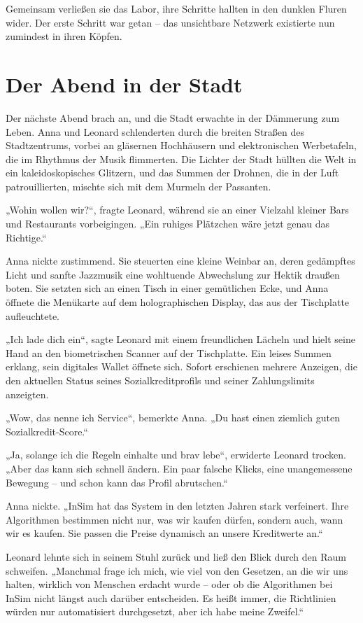 \documentclass[
]{article}
\begin{document}
Gemeinsam verließen sie das Labor, ihre Schritte hallten in den dunklen Fluren wider. Der erste Schritt war getan -- das unsichtbare Netzwerk existierte nun zumindest in ihren Köpfen.

\section{Der Abend in der Stadt}\label{der-abend-in-der-stadt}

Der nächste Abend brach an, und die Stadt erwachte in der Dämmerung zum Leben. Anna und Leonard schlenderten durch die breiten Straßen des Stadtzentrums, vorbei an gläsernen Hochhäusern und elektronischen Werbetafeln, die im Rhythmus der Musik flimmerten. Die Lichter der Stadt hüllten die Welt in ein kaleidoskopisches Glitzern, und das Summen der Drohnen, die in der Luft patrouillierten, mischte sich mit dem Murmeln der Passanten.

„Wohin wollen wir?{\kern0pt}``, fragte Leonard, während sie an einer Vielzahl kleiner Bars und Restaurants vorbeigingen. „Ein ruhiges Plätzchen wäre jetzt genau das Richtige.``

Anna nickte zustimmend. Sie steuerten eine kleine Weinbar an, deren gedämpftes Licht und sanfte Jazzmusik eine wohltuende Abwechslung zur Hektik draußen boten. Sie setzten sich an einen Tisch in einer gemütlichen Ecke, und Anna öffnete die Menükarte auf dem holographischen Display, das aus der Tischplatte aufleuchtete.

„Ich lade dich ein``, sagte Leonard mit einem freundlichen Lächeln und hielt seine Hand an den biometrischen Scanner auf der Tischplatte. Ein leises Summen erklang, sein digitales Wallet öffnete sich. Sofort erschienen mehrere Anzeigen, die den aktuellen Status seines Sozialkreditprofils und seiner Zahlungslimits anzeigten.

„Wow, das nenne ich Service``, bemerkte Anna. „Du hast einen ziemlich guten Sozialkredit-Score.``

„Ja, solange ich die Regeln einhalte und brav lebe``, erwiderte Leonard trocken. „Aber das kann sich schnell ändern. Ein paar falsche Klicks, eine unangemessene Bewegung -- und schon kann das Profil abrutschen.``

Anna nickte. „InSim hat das System in den letzten Jahren stark verfeinert. Ihre Algorithmen bestimmen nicht nur, was wir kaufen dürfen, sondern auch, wann wir es kaufen. Sie passen die Preise dynamisch an unsere Kreditwerte an.``

Leonard lehnte sich in seinem Stuhl zurück und ließ den Blick durch den Raum schweifen. „Manchmal frage ich mich, wie viel von den Gesetzen, an die wir uns halten, wirklich von Menschen erdacht wurde -- oder ob die Algorithmen bei InSim nicht längst auch darüber entscheiden. Es heißt immer, die Richtlinien würden nur automatisiert durchgesetzt, aber ich habe meine Zweifel.``
\end{document}
